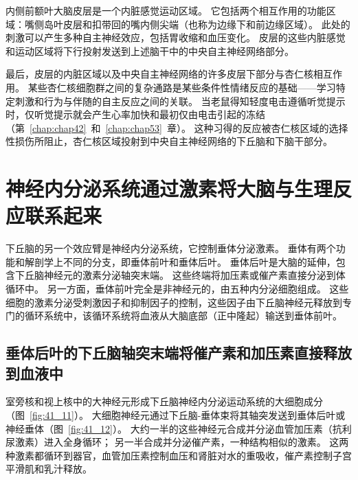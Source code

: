 内侧前额叶大脑皮层是一个内脏感觉运动区域。
它包括两个相互作用的功能区域：嘴侧岛叶皮层和扣带回的嘴内侧尖端（也称为边缘下和前边缘区域）。
此处的刺激可以产生多种自主神经效应，包括胃收缩和血压变化。
皮层的这些内脏感觉和运动区域将下行投射发送到上述脑干中的中央自主神经网络部分。


最后，皮层的内脏区域以及中央自主神经网络的许多皮层下部分与杏仁核相互作用。
某些杏仁核细胞群之间的复杂通路是某些条件性情绪反应的基础——学习特定刺激和行为与伴随的自主反应之间的关联。
当老鼠得知轻度电击遵循听觉提示时，仅听觉提示就会产生心率加快和最初仅由电击引起的冻结（第~\ref{chap:chap42}~和~\ref{chap:chap53}~章）。
这种习得的反应被杏仁核区域的选择性损伤所阻止，杏仁核区域投射到中央自主神经网络的下丘脑和下脑干部分。



\section{神经内分泌系统通过激素将大脑与生理反应联系起来}

下丘脑的另一个效应臂是神经内分泌系统，它控制垂体分泌激素。
垂体有两个功能和解剖学上不同的分支，即垂体前叶和垂体后叶。
垂体后叶是大脑的延伸，包含下丘脑神经元的激素分泌轴突末端。
这些终端将加压素或催产素直接分泌到体循环中。
另一方面，垂体前叶完全是非神经元的，由五种内分泌细胞组成。
这些细胞的激素分泌受刺激因子和抑制因子的控制，这些因子由下丘脑神经元释放到专门的循环系统中，该循环系统将血液从大脑底部（正中隆起）输送到垂体前叶。



\subsection{垂体后叶的下丘脑轴突末端将催产素和加压素直接释放到血液中}

室旁核和视上核中的大神经元形成下丘脑神经内分泌运动系统的大细胞成分（图~\ref{fig:41_11}）。
大细胞神经元通过下丘脑-垂体束将其轴突发送到垂体后叶或神经垂体（图~\ref{fig:41_12}）。
大约一半的这些神经元合成并分泌血管加压素（抗利尿激素）进入全身循环；
另一半合成并分泌催产素，一种结构相似的激素。
这两种激素都循环到器官，血管加压素控制血压和肾脏对水的重吸收，催产素控制子宫平滑肌和乳汁释放。


